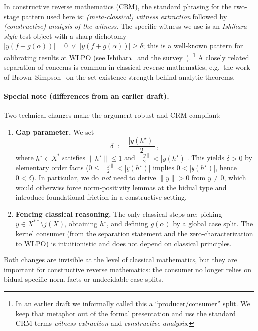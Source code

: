 \documentclass[11pt]{article}
\newcommand{\WLPO}{\mathrm{WLPO}}
\begin{document}
\begin{rem}
In constructive reverse mathematics (CRM), the standard phrasing for the two-stage pattern used here is:
\emph{(meta-classical) witness extraction} followed by \emph{(constructive) analysis of the witness}.
The specific witness we use is an \emph{Ishihara-style} test object with a sharp dichotomy
$|y(f+g(\alpha))|=0 \;\vee\; |y(f+g(\alpha))|\ge \delta$; this is a well-known pattern for calibrating results at
$\WLPO$ (see Ishihara~\cite{Ishihara90} and the survey~\cite{DienerCRM}).%
\footnote{In an earlier draft we informally called this a ``producer/consumer'' split. We keep that
metaphor out of the formal presentation and use the standard CRM terms \emph{witness extraction} and
\emph{constructive analysis}.}
A closely related separation of concerns is common in classical reverse mathematics, e.g.\ the work of
Brown--Simpson~\cite{BrownSimpson86} on the set-existence strength behind analytic theorems.
\end{rem}

\paragraph{Special note (differences from an earlier draft).}
Two technical changes make the argument robust and CRM-compliant:
\begin{enumerate}
  \item \textbf{Gap parameter.} We set
  \[
    \delta \;:=\; \frac{|y(h^\star)|}{2}\,,
  \]
  where $h^\star\in X^\ast$ satisfies $\|h^\star\|\le 1$ and
  $\tfrac{\|y\|}{2}<|y(h^\star)|$. This yields $\delta>0$ by elementary
  order facts ($0\le \tfrac{\|y\|}{2} < |y(h^\star)|$ implies $0<|y(h^\star)|$,
  hence $0<\delta$). In particular, we do \emph{not} need to derive $\|y\|>0$
  from $y\neq 0$, which would otherwise force norm-positivity lemmas at the bidual
  type and introduce foundational friction in a constructive setting.
  \item \textbf{Fencing classical reasoning.} The only classical steps are:
  picking $y\in X^{**}\!\setminus j(X)$, obtaining $h^\star$, and
  defining $g(\alpha)$ by a global case split. The kernel consumer
  (from the separation statement and the zero-characterization to $\WLPO$)
  is intuitionistic and does not depend on classical principles.
\end{enumerate}
Both changes are invisible at the level of classical mathematics, but they are
important for constructive reverse mathematics: the consumer no longer relies on
bidual-specific norm facts or undecidable case splits.
\end{document}

